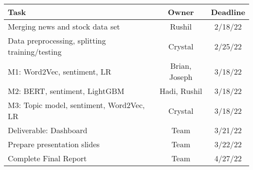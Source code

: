 \documentclass[conference]{IEEEtran}
\begin{document}
\begin{table}[htbp]
    \begin{center}
        \begin{tabular}{|l||c|c|} \hline\hline
            Task                                               & Owner         & Deadline  \\ \hline
            Merging news and stock data set                    & Rushil        & 2/18/22   \\
            Data preprocessing, splitting training/testing & Crystal       & 2/25/22   \\
            M1: Word2Vec, sentiment, LR                  & Brian, Joseph & 3/18/22   \\
            M2: BERT, sentiment, LightGBM                & Hadi, Rushil  & 3/18/22   \\
            M3: Topic model, sentiment, Word2Vec, LR     & Crystal       & 3/18/22 \\
            Deliverable: Dashboard                             & Team          & 3/21/22 \\
            Prepare presentation slides                             & Team          & 3/22/22 \\
            Complete Final Report                             & Team          & 4/27/22 \\
            \hline\hline
        \end{tabular}
    \end{center}
\end{table}
\end{document}
